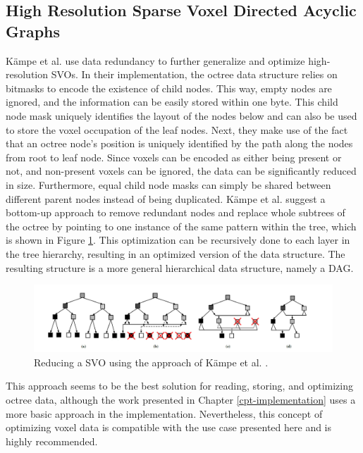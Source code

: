 \subsection*{High Resolution Sparse Voxel Directed Acyclic Graphs} \label{subsec-highres-svo-dags}

Kämpe et al. \cite{Kampe2013} use data redundancy to further generalize and optimize high-resolution 
\ac{SVO}s. In their implementation, the octree data structure relies on bitmasks to encode the existence of child 
nodes. This way, empty nodes are ignored, and the information can be easily stored within one byte. This child node 
mask uniquely identifies the layout of the nodes below and can also be used to store the voxel occupation of the 
leaf nodes. Next, they make use of the fact that an octree node's position is uniquely identified by the path along 
the nodes from root to leaf node. Since voxels can be encoded as either being present or not, and non-present 
voxels can be ignored, the data can be significantly reduced in size. Furthermore, equal child node masks 
can simply be shared between different parent nodes instead of being duplicated. Kämpe et al. \cite{Kampe2013} 
suggest a bottom-up approach to remove redundant nodes and replace whole subtrees of the octree by pointing to one 
instance of the same pattern within the tree, which is shown in Figure \ref{fig:sparse-voxel-dag-creation}. 
This optimization can be recursively done to each layer in the tree hierarchy, resulting in an optimized version 
of the data structure. The resulting structure is a more general hierarchical data structure, namely a \ac{DAG}.

\begin{figure}[h]
    \centering
    \includegraphics[width=\linewidth]{images/graphics/highres-sv-dag.jpg}
    \caption{Reducing a \ac{SVO} using the approach of Kämpe et al. \cite{Kampe2013}.}
    \label{fig:sparse-voxel-dag-creation}
\end{figure}

\noindent
This approach seems to be the best solution for reading, storing, and optimizing octree data, although the work
presented in Chapter \ref{cpt-implementation} uses a more basic approach in the implementation. Nevertheless, 
this concept of optimizing voxel data is compatible with the use case presented here and is highly recommended.


